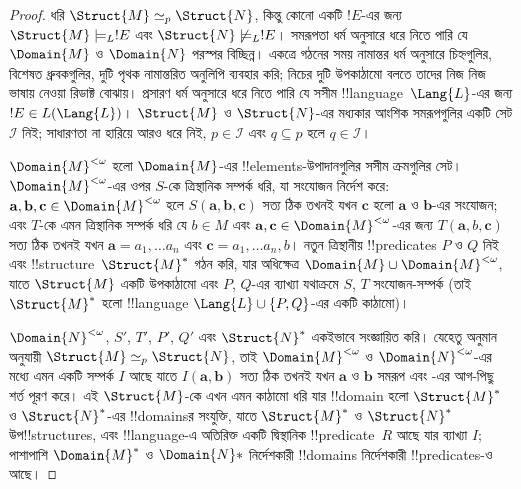 \documentclass[../../../include/open-logic-section]{subfiles}
\begin{document}
\begin{proof}
ধরি $\Struct{M} \simeq_p \Struct{N}$, কিন্তু কোনো একটি $!E$-এর জন্য
$\Struct{M} \models_L !E$ এবং $\Struct{N} \not\models_L !E$।
সমরূপতা ধর্ম অনুসারে ধরে নিতে পারি যে $\Domain{M}$ ও $\Domain{N}$
পরস্পর বিচ্ছিন্ন। একত্রে গঠনের সময় নামান্তর ধর্ম অনুসারে চিহ্নগুলির,
বিশেষত ধ্রুবকগুলির, দুটি পৃথক নামান্তরিত অনুলিপি ব্যবহার করি;
নিচের দুটি উপকাঠামো বলতে তাদের নিজ নিজ ভাষায় নেওয়া রিডাক্ট বোঝায়।
প্রসারণ ধর্ম অনুসারে ধরে নিতে পারি যে সসীম
!!{language}~$\Lang{L}$-এর জন্য $!E \in L(\Lang{L})$।
$\Struct{M}$ ও $\Struct{N}$-এর মধ্যকার আংশিক সমরূপগুলির একটি সেট
$\mathcal{I}$ নিই; সাধারণতা না হারিয়ে আরও ধরে নিই, $p \in \mathcal{I}$
এবং $q \subseteq p$ হলে $q \in \mathcal{I}$।

$\Domain{M}^{<\omega}$ হলো $\Domain{M}$-এর !!{element}s-উপাদানগুলির সসীম
ক্রমগুলির সেট। $\Domain{M}^{<\omega}$-এর ওপর $S$-কে ত্রিস্থানিক
সম্পর্ক ধরি, যা সংযোজন নির্দেশ করে: $\mathbf{a}, \mathbf{b},
\mathbf{c} \in \Domain{M}^{<\omega}$ হলে $S(\mathbf{a}, \mathbf{b},
\mathbf{c})$ সত্য ঠিক তখনই যখন $\mathbf{c}$ হলো $\mathbf{a}$ ও
$\mathbf{b}$-এর সংযোজন; এবং $T$-কে এমন ত্রিস্থানিক সম্পর্ক ধরি যে
$b \in M$ এবং $\mathbf{a}, \mathbf{c} \in \Domain{M}^{<\omega}$-এর
জন্য $T(\mathbf{a}, b, \mathbf{c})$ সত্য ঠিক তখনই যখন
$\mathbf{a} = a_1, \dots a_n$ এবং $\mathbf{c} = a_1, \dots a_n, b$।
নতুন ত্রিস্থানীয় !!{predicate}s $P$ ও $Q$ নিই এবং
!!{structure}~$\Struct{M}^*$ গঠন করি, যার অধিক্ষেত্র
$\Domain{M} \cup \Domain{M}^{<\omega}$, যাতে $\Struct{M}$ একটি
উপকাঠামো এবং $P$, $Q$-এর ব্যাখ্যা যথাক্রমে $S$, $T$ সংযোজন-সম্পর্ক
(তাই $\Struct{M}^*$ হলো !!{language}
$\Lang{L} \cup \{ P, Q\}$-এর একটি কাঠামো)।

$\Domain{N}^{<\omega}$, $S'$, $T'$, $P'$, $Q'$ এবং
$\Struct{N}^*$ একইভাবে সংজ্ঞায়িত করি। যেহেতু অনুমান অনুযায়ী
$\Struct{M} \simeq_p \Struct{N}$, তাই $\Domain{M}^{<\omega}$ ও
$\Domain{N}^{<\omega}$-এর মধ্যে এমন একটি সম্পর্ক $I$ আছে যাতে
$I(\mathbf{a}, \mathbf{b})$ সত্য ঠিক তখনই যখন $\mathbf{a}$ ও
$\mathbf{b}$ সমরূপ এবং -এর
আগ-পিছু শর্ত পূরণ করে। এই $\Struct{M}$-কে এখন এমন কাঠামো ধরি যার
!!{domain} হলো $\Struct{M}^*$ ও $\Struct{N}^*$-এর !!{domain}sর
সংযুক্তি, যাতে $\Struct{M}^*$ ও $\Struct{N}^*$ উপ!!{structure}s, এবং
!!{language}-এ অতিরিক্ত একটি দ্বিস্থানিক !!{predicate}~$R$ আছে যার
ব্যাখ্যা $I$; পাশাপাশি $\Domain{M}^*$ ও $\Domain{N}*$ নির্দেশকারী
!!{domain}s নির্দেশকারী !!{predicate}s-ও আছে।


\end{proof}
\end{document}
